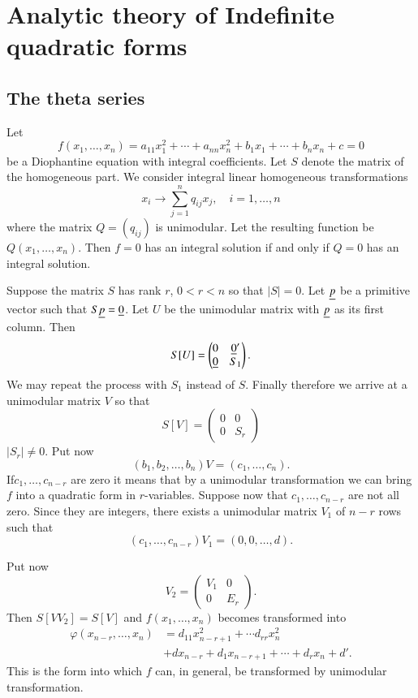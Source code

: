 \chapter{Analytic theory of Indefinite quadratic forms}\label{chap4}

\section{The theta series}\label{chap4:sec1}\pageoriginale

Let
\begin{equation*}
f(x_{1},\ldots,x_{n})=a_{11}x^{2}_{1}+\cdots+a_{nn}
x_{n}^{2}+b_{1}x_{1}+\cdots+b_{n}x_{n}+c=0\tag{1}\label{c4:eq1}
\end{equation*}
be a Diophantine equation with integral coefficients. Let $S$ denote
the matrix of the homogeneous part. We consider integral linear
homogeneous transformations
$$
x_{i}\to \sum^{n}_{j=1}q_{ij}x_{j},\quad i=1,\ldots,n
$$
where the matrix $Q=(q_{ij})$ is unimodular. Let the resulting
function be $Q(x_{1},\ldots,x_{n})$. Then $f=0$ has an integral
solution if and only if $Q=0$ has an integral solution.

Suppose the matrix $S$ has rank $r$, $0<r<n$ so that $|S|=0$. Let
$\underline{p}$ be a primitive vector such that $S\underline{p}=\underline{0}$. Let $U$ be
the unimodular matrix with $\underline{p}$ as its first column. Then 
$$
S[U]=
\begin{pmatrix}
0 & \underline{0}'\\
\underline{0} & S_{1}               
\end{pmatrix}.
$$
We may repeat the process with $S_{1}$ instead of $S$. Finally
therefore we arrive at a unimodular matrix $V$ so that
$$
S[V]=
\begin{pmatrix}
0 & 0\\
0 & S_{r}
\end{pmatrix}
$$
$|S_{r}|\neq 0$. Put now
$$
(b_{1},b_{2},\ldots,b_{n})V=(c_{1},\ldots,c_{n}).
$$
If\pageoriginale $c_{1},\ldots,c_{n-r}$ are zero it means that by a
unimodular transformation we can bring $f$ into a quadratic form in
$r$-variables. Suppose now that $c_{1},\ldots,c_{n-r}$ are not all
zero. Since they are integers, there exists a unimodular matrix
$V_{1}$ of $n-r$ rows such that
$$
(c_{1},\ldots,c_{n-r})V_{1}=(0,0,\ldots,d).
$$

Put now
$$
V_{2}=
\begin{pmatrix}
V_{1} & 0\\
0 & E_{r}
\end{pmatrix}.
$$
Then $S[VV_{2}]=S[V]$ and $f(x_{1},\ldots,x_{n})$ becomes transformed
into 
\begin{align*}
\varphi(x_{n-r},\ldots,x_{n}) &= d_{11}x^{2}_{n-r+1}+\cdots
d_{rr}x^{2}_{n}\\
 &+dx_{n-r}+d_{1}x_{n-r+1}+\cdots+d_{r}x_{n}+d'.
\end{align*}
This is the form into which $f$ can, in general, be transformed by
unimodular transformation.

